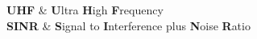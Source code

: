 %
\textbf{UHF} & \textbf{U}ltra \textbf{H}igh \textbf{F}requency\\
\textbf{SINR} & \textbf{S}ignal to \textbf{I}nterference plus \textbf{N}oise \textbf{R}atio\\
